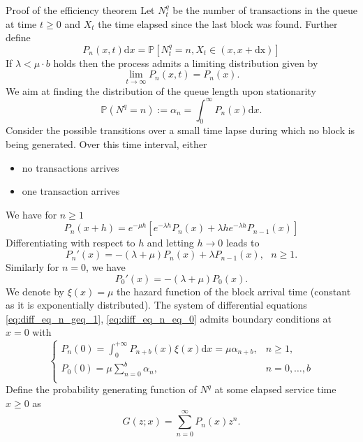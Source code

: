 \documentclass{beamer}
\begin{document}
\begin{frame}[allowframebreaks]{Proof of the efficiency theorem}
\scriptsize
Let $N^q_t$ be the number of transactions in the queue at time $t\geq0$ and $X_t$ the time elapsed since the last block was found. Further define
\[
P_{n}(x,t)\text{d}x  =\mathbb{P}[N_t^q = n, X_t \in(x, x + \text{dx})] 
\]
If $\lambda < \mu\cdot b$ holds then the process admits a limiting distribution given by 
\[
\underset{t\rightarrow\infty}{\lim}P_{n}(x,t) = P_{n}(x).
\]
We aim at finding the distribution of the queue length upon stationarity
\begin{equation}\label{eq:alpha_n}
\mathbb{P}(N^q=n):=\alpha_n =\int_{0}^\infty P_{n}(x)\text{d}x.
\end{equation}
Consider the possible transitions over a small time lapse  during which no block is being generated. Over this time interval, either 
\begin{itemize}
  \item no transactions arrives
  \item one transaction arrives
\end{itemize}
We have for $n\geq1$
\[
P_{n}(x+h) = e^{-\mu h}\left[e^{-\lambda h}P_{n}(x)+\lambda h e^{-\lambda h}P_{n-1}(x)\right]
\]
Differentiating with respect to $h$ and letting $h\rightarrow0$ leads to 
\begin{equation}\label{eq:diff_eq_n_geq_1}
P_{n}'(x) = -(\lambda+\mu)P_{n}(x)+\lambda P_{n-1}(x),\text{ }n \geq1.
\end{equation}
Similarly for $n = 0$, we have 
\begin{equation}\label{eq:diff_eq_n_eq_0}
P_{0}'(x) = -(\lambda+\mu)P_{0}(x).
\end{equation}
We denote by $\xi(x) = \mu$ the hazard function of the block arrival time (constant as it is exponentially distributed). The system of differential equations \eqref{eq:diff_eq_n_geq_1}, \eqref{eq:diff_eq_n_eq_0} admits boundary conditions at $x = 0$ with 
\begin{equation}\label{eq:boundary_cond_1}
\begin{cases}
P_{n}(0) = \int_0^{+\infty} P_{n+b}(x)\xi(x)\text{d}x = \mu\alpha_{n+b},&n \geq1,\\
P_{0}(0) = \mu\sum_{n=0}^{b}\alpha_n,&n = 0,\ldots,b\\
\end{cases}
\end{equation}
Define the probability generating function of $N^q$ at some elapsed service time $x\geq 0$ as 
$$
G(z;x) = \sum_{n=0}^\infty P_{n}(x)z^n.
$$
\end{frame}
\end{document}
